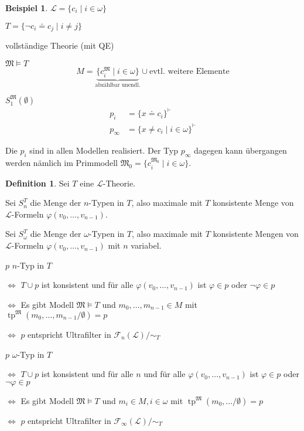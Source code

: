 \documentclass[12pt,parskip=full]{scrartcl}
\theoremstyle{definition}
\newtheorem{definition}[theorem]{Definition}
\newtheorem{example}[theorem]{Beispiel}
\begin{document}
	\begin{example}
		$\mathcal{L} = \{ c_i \mid i \in \omega \}$
		
		$T = \{ \lnot c_i \doteq c_j \mid i \neq j \}$
		
		vollständige Theorie (mit QE)
		
		$\mathfrak{M} \models T$
		\begin{equation*}
			M = \underbrace{\{ c_i^\mathfrak{M} \mid i \in \omega \}}_\text{abzählbar unendl.} \cup \text{evtl. weitere Elemente}
		\end{equation*}
		
		$S_1^\mathfrak{M}(\emptyset)$
		\begin{align*}
			p_i &= \{ x \doteq c_i \}^\vdash \\
			p_\infty &= \{ x \neq c_i \mid i \in \omega \}^\vdash
		\end{align*}
		
		Die $p_i$ sind in allen Modellen realisiert. Der Typ $p_\infty$ dagegen kann übergangen werden nämlich im Primmodell $\mathfrak{M_0} = \{ c_i^\mathfrak{M_0} \mid i \in \omega \}$.		
	\end{example}

	\begin{definition}
		Sei $T$ eine $\mathcal{L}$-Theorie.
		
		Sei $S_n^T$ die Menge der $n$-Typen in $T$, also maximale mit $T$ konsistente Menge von $\mathcal{L}$-Formeln $\varphi(v_0, \dots, v_{n-1})$.
		
		Sei $S_\omega^T$ die Menge der $\omega$-Typen in $T$, also maximale mit $T$ konsistente Mengen von $\mathcal{L}$-Formeln $\varphi(v_0, \dots, v_{n-1})$ mit $n$ variabel.
		
		$p$ $n$-Typ in $T$
		
		$\Leftrightarrow$ $T \cup p$ ist konsistent und für alle $\varphi(v_0, \dots, v_{n-1})$ ist $\varphi \in p$ oder $\lnot \varphi \in p$
		
		$\Leftrightarrow$ Es gibt Modell $\mathfrak{M} \models T$ und $m_0, \dots, m_{n-1} \in M$ mit $\operatorname{tp}^\mathfrak{M}(m_0, \dots, m_{n-1} / \emptyset) = p$
		
		$\Leftrightarrow$ $p$ entspricht Ultrafilter in $\mathcal{F}_n(\mathcal{L}) / \sim_T$
		
		$p$ $\omega$-Typ in $T$
		
		$\Leftrightarrow$ $T \cup p$ ist konsistent und für alle $n$ und für alle $\varphi(v_0, \dots, v_{n-1})$ ist $\varphi \in p$ oder $\lnot \varphi \in p$
		
		$\Leftrightarrow$ Es gibt Modell $\mathfrak{M} \models T$ und $m_i \in M, i \in \omega$ mit $\operatorname{tp}^\mathfrak{M}(m_0, \dots / \emptyset) = p$
		
		$\Leftrightarrow$ $p$ entspricht Ultrafilter in $\mathcal{F}_\infty(\mathcal{L}) / \sim_T$
	\end{definition}
\end{document}
